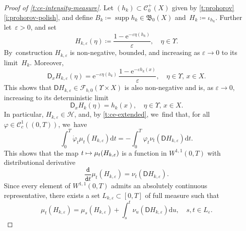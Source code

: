 \documentclass[JEP,XML,SOM,Unicode,published]{cedram}
\newcommand\mto{\mathchoice{\longmapsto}{\mapsto}{\mapsto}{\mapsto}}
\theoremstyle{definition}
\theoremstyle{remark}
\begin{document}
\begin{proof}[Proof of \cref{t:ce-intensity-measure}]
Let $(h_{k}) \subset \mathscr{C}_{0}^+(X)$ given by \cref{t:prohorov}\,\cref{i:prohorov-polish}, and define $B_k\coloneq \operatorname{supp} h_k\in \mathfrak{B}_0(X)$ and~$H_{k} \coloneq \iota_{h_{k}}$.
Further let~$\varepsilon > 0$, and set
\begin{equation*}
H_{k,\varepsilon}(\eta) \coloneq \frac{1 - \mathrm{e}^{-\varepsilon \eta(h_{k})}}{\varepsilon}, \quad \eta \in \varUpsilon.
\end{equation*}
By~construction $H_{k,\varepsilon}$ is non-negative, bounded, and increasing as $\varepsilon \to 0$ to its limit~$H_{k}$.
Moreover,
\begin{equation}\label{eq:t:ce-intensity-measure:1}
\mathsf{D}_{x} H_{k,\varepsilon}(\eta) = \mathrm{e}^{-\varepsilon \eta(h_k)}\, \frac{1-\mathrm{e}^{-\varepsilon h_{k}(x)}}{\varepsilon}, \quad \eta \in \varUpsilon,\, x \in X.
\end{equation}
This shows that $\mathsf{D} H_{k,\varepsilon} \in \mathscr{F}_{b,0}(\varUpsilon \times X)$ is also non-negative and is, as $\varepsilon \to 0$, increasing to its deterministic limit
\begin{equation*}
\mathsf{D}_{x} H_{k}(\eta) = h_{k}(x), \quad \eta \in \varUpsilon,\, x \in X.
\end{equation*}
In particular, $H_{k,\varepsilon} \in \mathscr{H}$, and, by \cref{t:ce-extended}, we~find that, for all $\varphi \in \mathscr{C}_{c}^{1}((0,T))$, we~have
\begin{equation*}
\int_{0}^{T} \dot{\varphi}_{t} \mu_{t}(H_{k,\varepsilon}) \mathrm{d} t = - \int_{0}^{T} \varphi_{t} \nu_{t}(\mathsf{D} H_{k,\varepsilon}) \mathrm{d} t .
\end{equation*}
This shows that the map $t \mto \mu_{t}(H_{k,\varepsilon})$ is a function in $W^{1,1}(0,T)$ with distributional derivative
\begin{equation*}
\frac{\mathtt{d}}{\mathtt{d} t} \mu_{t}(H_{k,\varepsilon}) = \nu_{t}(\mathsf{D} H_{k,\varepsilon}) .
\end{equation*}
Since every element of $W^{1,1}(0,T)$ admits an absolutely continuous representative, there exists a set $L_{k,\varepsilon} \subset [0,T]$ of full measure such that
\begin{equation}\label{e:ce-g-epsilon}
\mu_{t}(H_{k,\varepsilon}) = \mu_{s}(H_{k,\varepsilon}) + \int_{s}^{t} \nu_{u}(\mathsf{D} H_{k,\varepsilon}) \mathrm{d} u, \quad s,t \in L_{\varepsilon}.
\end{equation}

\end{proof}
\end{document}
